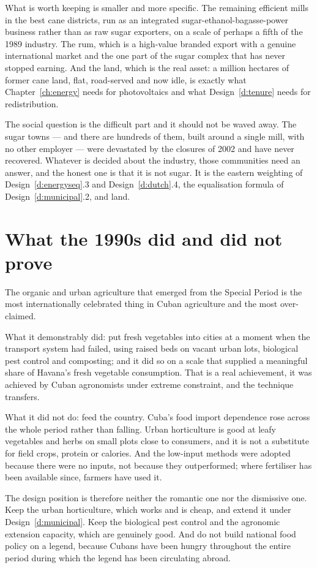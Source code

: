 What is worth keeping is smaller and more specific. The remaining efficient mills
in the best cane districts, run as an integrated sugar-ethanol-bagasse-power
business rather than as raw sugar exporters, on a scale of perhaps a fifth of the
1989 industry. The rum, which is a high-value branded export with a genuine
international market and the one part of the sugar complex that has never
stopped earning. And the land, which is the real asset: a million hectares of
former cane land, flat, road-served and now idle, is exactly what
Chapter~\ref{ch:energy} needs for photovoltaics and what Design~\ref{d:tenure}
needs for redistribution.

The social question is the difficult part and it should not be waved away. The
sugar towns --- and there are hundreds of them, built around a single mill, with
no other employer --- were devastated by the closures of 2002 and have never
recovered. Whatever is decided about the industry, those communities need an
answer, and the honest one is that it is not sugar. It is the eastern weighting
of Design~\ref{d:energyseq}.3 and Design~\ref{d:dutch}.4, the equalisation formula
of Design~\ref{d:municipal}.2, and land.

\section{What the 1990s did and did not prove}

The organic and urban agriculture that emerged from the Special Period is the
most internationally celebrated thing in Cuban agriculture and the most
over-claimed.

What it demonstrably did: put fresh vegetables into cities at a moment when the
transport system had failed, using raised beds on vacant urban lots, biological
pest control and composting; and it did so on a scale that supplied a meaningful
share of Havana's fresh vegetable consumption. That is a real achievement, it was
achieved by Cuban agronomists under extreme constraint, and the technique
transfers.

What it did not do: feed the country. Cuba's food import dependence rose across
the whole period rather than falling. Urban horticulture is good at leafy
vegetables and herbs on small plots close to consumers, and it is not a
substitute for field crops, protein or calories. And the low-input methods were
adopted because there were no inputs, not because they outperformed; where
fertiliser has been available since, farmers have used it.

The design position is therefore neither the romantic one nor the dismissive one.
Keep the urban horticulture, which works and is cheap, and extend it under
Design~\ref{d:municipal}. Keep the biological pest control and the agronomic
extension capacity, which are genuinely good. And do not build national food
policy on a legend, because Cubans have been hungry throughout the entire period
during which the legend has been circulating abroad.
